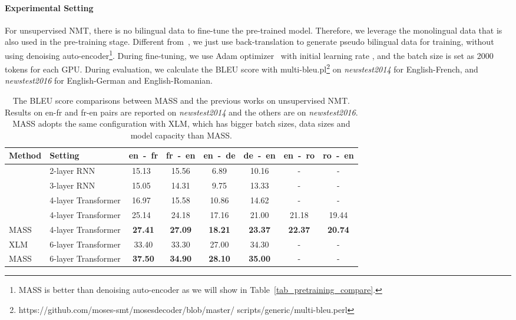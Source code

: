 \documentclass{article}
\begin{document}
	\paragraph{Experimental Setting} For unsupervised NMT, there is no bilingual data to fine-tune the pre-trained model. Therefore, we leverage the monolingual data that is also used in the pre-training stage. Different from~\citet{artetxe2017unsupervised,lample2017unsupervised,DBLP:conf/emnlp/LampleOCDR18,leng2019unsupervised}, we just use back-translation to generate pseudo bilingual data for training, without using denoising auto-encoder\footnote{MASS is better than denoising auto-encoder as we will show in Table~\ref{tab_pretraining_compare}.}. During fine-tuning, we use Adam optimizer~\cite{kingma2015adam} with initial learning rate , and the batch size is set as 2000 tokens for each GPU. During evaluation, we calculate the BLEU score with multi-bleu.pl\footnote{https://github.com/moses-smt/mosesdecoder/blob/master/ scripts/generic/multi-bleu.perl} on \emph{newstest2014} for English-French, and \emph{newstest2016} for English-German and English-Romanian.
\iffalse
	\begin{table*}[h]
		\small
		\centering
		\begin{tabular}{l|l|c c |  c c | c c}
			\toprule
Method & Setting & en~-~fr & fr~-~en & en~-~de & de~-~en &en~-~ro & ro~-~en \\
			\midrule
			\citet{artetxe2017unsupervised} & 2-layer RNN & 15.13~ & 15.56 & 6.89 & 10.16 & - & - \\
			\citet{lample2017unsupervised}  & 3-layer RNN & 15.05~ & 14.31 & 9.75  & 13.33 & - & - \\
			\citet{yang2018unsupervised}    & 4-layer Transformer & 16.97~ & 15.58 & 10.86 & 14.62 & - & - \\
			
			\citet{DBLP:conf/emnlp/LampleOCDR18} & 4-layer Transformer & 25.14~ & 24.18 & 17.16 & 21.00 & 21.18 & 19.44 \\
			\midrule
			MASS 		& 4-layer Transformer & \textbf{27.41} & \textbf{27.09} & \textbf{18.21} & \textbf{23.37} & \textbf{22.37} & \textbf{20.74} \\
			\bottomrule
			\toprule
			
			XLM~\citep{Lample2019MLM}  			& 6-layer Transformer & 33.40 & 33.30 & 27.00 & 34.30 & - & - \\
			\midrule
			
			MASS & 6-layer Transformer & \textbf{37.50} & \textbf{34.90} & \textbf{28.10} & \textbf{35.00} & - & - \\
			\bottomrule
			
		\end{tabular}
		\vspace{-0.2cm}
		\caption{The BLEU score comparisons between MASS and the previous works on unsupervised NMT. Results on en-fr and fr-en pairs are reported on \emph{newstest2014} and the others are on \emph{newstest2016}. MASS adopts the same configuration with XLM, which has bigger batch sizes, data sizes and model capacity than MASS.}
		\label{table_unsup_result}
	\end{table*}
\end{document}
